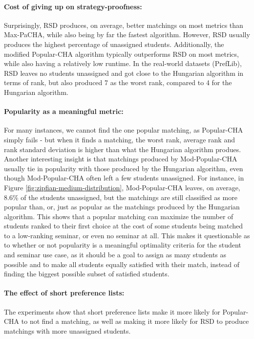\paragraph{Cost of giving up on strategy-proofness:} Surprisingly, RSD produces, on average, better matchings on most metrics than Max-PaCHA, while also being by far the fastest algorithm. However, RSD usually produces the highest percentage of unassigned students. Additionally, the modified Popular-CHA algorithm typically outperforms RSD on most metrics, while also having a relatively low runtime. In the real-world datasets (PrefLib), RSD leaves no students unassigned and got close to the Hungarian algorithm in terms of rank, but also produced 7 as the worst rank, compared to 4 for the Hungarian algorithm. 
\paragraph{Popularity as a meaningful metric:} For many instances, we cannot find the one popular matching, as Popular-CHA simply fails - but when it finds a matching, the worst rank, average rank and rank standard deviation is higher than what the Hungarian algorithm produes. Another interesting insight is that matchings produced by Mod-Popular-CHA usually tie in popularity with those produced by the Hungarian algorithm, even though Mod-Popular-CHA often left a few students unassigned. For instance, in Figure \ref{fig:zipfian-medium-distribution}, Mod-Popular-CHA leaves, on average, 8.6\% of the students unassigned, but the matchings are still classified as more popular than, or, just as popular as the matchings produced by the Hungarian algorithm. This shows that a popular matching can maximize the number of students ranked to their first choice at the cost of some students being matched to a low-ranking seminar, or even no seminar at all. This makes it questionable as to whether or not popularity is a meaningful optimality criteria for the student and seminar use case, as it should be a goal to assign as many students as possible and to make all students equally satisfied with their match, instead of finding the biggest possible subset of satisfied students.
\paragraph{The effect of short preference lists:} The experiments show that short preference lists make it more likely for Popular-CHA to not find a matching, as well as making it more likely for RSD to produce matchings with more unassigned students.
